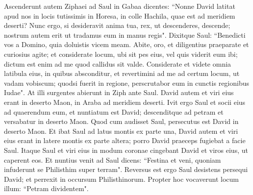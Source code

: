 \begin{biblechapter}
\verse Ascenderunt autem Ziphaei ad Saul in Gabaa dicentes: “Nonne David latitat apud nos in locis tutissimis in Horesa, in colle Hachila, quae est ad meridiem deserti? 
\verse Nunc ergo, si desideravit anima tua, rex, ut descenderes, descende; nostrum autem erit ut tradamus eum in manus regis". 
\verse Dixitque Saul: “Benedicti vos a Domino, quia doluistis vicem meam. 
\verse Abite, oro, et diligentius praeparate et curiosius agite; et considerate locum, ubi sit pes eius, vel quis viderit eum ibi; dictum est enim ad me quod callidus sit valde.  
\verse Considerate et videte omnia latibula eius, in quibus absconditur, et revertimini ad me ad certum locum, ut vadam vobiscum; quodsi fuerit in regione, perscrutabor eum in cunctis regionibus Iudae". 
\verse At illi surgentes abierunt in Ziph ante Saul. David autem et viri eius erant in deserto Maon, in Araba ad meridiem deserti.  
\verse Ivit ergo Saul et socii eius ad quaerendum eum, et nuntiatum est David; descenditque ad petram et versabatur in deserto Maon. Quod cum audisset Saul, persecutus est David in deserto Maon. 
\verse Et ibat Saul ad latus montis ex parte una, David autem et viri eius erant in latere montis ex parte altera; porro David praeceps fugiebat a facie Saul. Itaque Saul et viri eius in modum coronae cingebant David et viros eius, ut caperent eos. 
\verse Et nuntius venit ad Saul dicens: “Festina et veni, quoniam infuderunt se Philisthim super terram". 
\verse Reversus est ergo Saul desistens persequi David; et perrexit in occursum Philisthinorum. Propter hoc vocaverunt locum illum: “Petram dividentem". 
\end{biblechapter}


